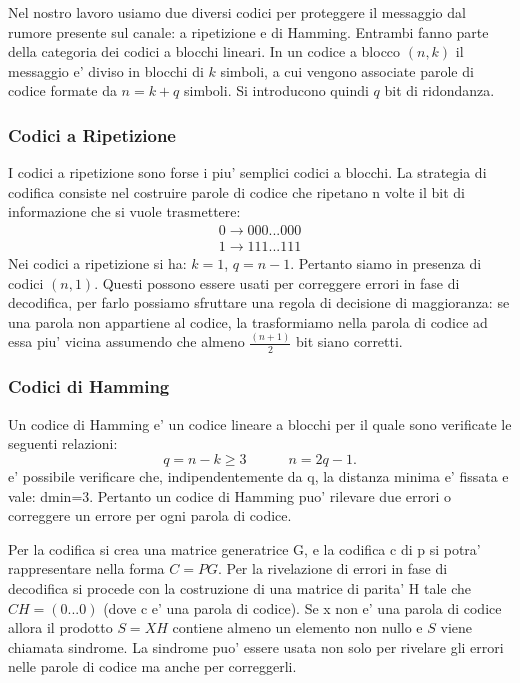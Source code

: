 \documentclass[a4paper,11pt]{article}
\theoremstyle{definition}
\begin{document}
Nel nostro lavoro usiamo due diversi codici per proteggere il messaggio dal rumore presente sul canale: a ripetizione e di Hamming. Entrambi fanno parte della categoria dei codici a blocchi lineari. In un codice a blocco $(n,k)$ il messaggio e' diviso in blocchi di $k$ simboli, a cui vengono associate parole di codice formate da $n=k+q$ simboli. Si introducono quindi $q$ bit di ridondanza.

\subsubsection{Codici a Ripetizione}
I codici a ripetizione sono forse i piu' semplici codici a blocchi. La strategia di codifica consiste nel costruire parole di codice che ripetano n volte il bit di informazione che si vuole trasmettere:
\begin{gather*}
0 \rightarrow 000...000 \\
1 \rightarrow 111...111
\end{gather*}
Nei codici a ripetizione si ha: $k=1$, $q=n-1$. Pertanto siamo in presenza di codici $(n,1)$. Questi possono essere usati per correggere errori in fase di decodifica, per farlo possiamo sfruttare una regola di decisione di maggioranza: se una parola non appartiene al codice, la trasformiamo nella parola di codice ad essa piu' vicina assumendo che almeno $\frac{(n+1)}{2}$ bit siano corretti.


\subsubsection{Codici di Hamming}
Un codice di Hamming e' un codice lineare a blocchi per il quale sono verificate le seguenti relazioni:
\[q=n-k\geq3 \qquad \quad n=2q-1.\]
e' possibile verificare che, indipendentemente da q, la distanza minima e' fissata e vale: dmin=3. Pertanto un codice di Hamming puo' rilevare due errori o correggere un errore per ogni parola di codice. 

Per la codifica si crea una matrice generatrice G, e la codifica c di p si potra' rappresentare nella forma $C=PG$. Per la rivelazione di errori in fase di decodifica si procede con la costruzione di una matrice di parita' H tale che $CH=(0...0)$ (dove c e' una parola di codice). Se x non e' una parola di codice allora il prodotto $S=XH$ contiene almeno un elemento non nullo e $S$ viene chiamata sindrome. La sindrome puo' essere usata non solo per rivelare gli errori nelle parole di codice ma anche per correggerli.
\end{document}
